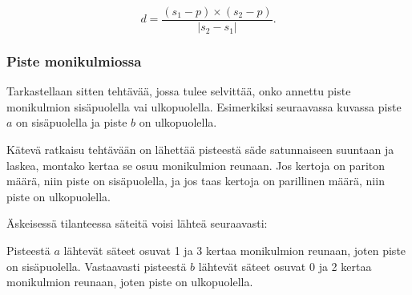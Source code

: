 \[ d = \frac{(s_1-p) \times (s_2-p)}{|s_2-s_1|} .\]


\subsubsection{Piste monikulmiossa}

Tarkastellaan sitten tehtävää, jossa
tulee selvittää, onko annettu piste
monikulmion sisäpuolella vai ulkopuolella.
Esimerkiksi seuraavassa kuvassa piste $a$ on
sisäpuolella ja piste $b$ on 
ulkopuolella.

\begin{center}
\end{center}

Kätevä ratkaisu tehtävään
on lähettää pisteestä säde
satunnaiseen suuntaan ja laskea,
montako kertaa se osuu monikulmion reunaan.
Jos kertoja on pariton määrä,
niin piste on sisäpuolella,
ja jos taas kertoja on parillinen määrä,
niin piste on ulkopuolella.

\begin{samepage}
Äskeisessä tilanteessa säteitä
voisi lähteä seuraavasti:
\begin{center}
\end{center}
\end{samepage}

Pisteestä $a$ lähtevät säteet osuvat 1 ja 3
kertaa monikulmion reunaan,
joten piste on sisäpuolella.
Vastaavasti pisteestä $b$ lähtevät
säteet osuvat 0 ja 2 kertaa monikulmion reunaan,
joten piste on ulkopuolella.


